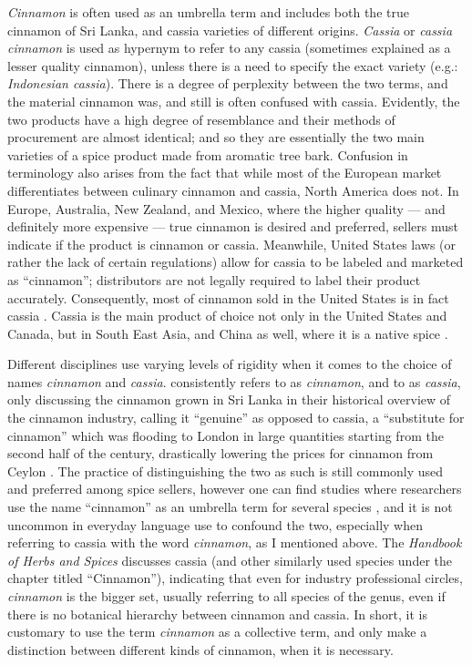\textit{Cinnamon} is often used as an umbrella term and includes both the true cinnamon of Sri Lanka, and cassia varieties of different origins. \textit{Cassia} or \textit{cassia cinnamon} is used as hypernym to refer to any cassia (sometimes explained as a lesser quality cinnamon), unless there is a need to specify the exact variety (e.g.: \textit{Indonesian cassia}). There is a degree of perplexity between the two terms, and the material cinnamon was, and still is often confused with cassia. Evidently, the two products have a high degree of resemblance and their methods of procurement are almost identical; and so they are essentially the two main varieties of a spice product made from aromatic tree bark. Confusion in terminology also arises from the fact that while most of the European market differentiates between culinary cinnamon and cassia, North America does not. In Europe, Australia, New Zealand, and Mexico, where the higher quality --- and definitely more expensive --- true cinnamon is desired and preferred, sellers must indicate if the product is cinnamon or cassia. Meanwhile, United States laws (or rather the lack of certain regulations) allow for cassia to be labeled and marketed as ``cinnamon''; distributors are not legally required to label their product accurately. Consequently, most of cinnamon sold in the United States is in fact cassia \autocite[124]{czarra_spices_2009}. Cassia is the main product of choice not only in the United States and Canada, but in South East Asia, and China as well, where it is a native spice \parencite[104]{van_wyk_culinary_2014}.

Different disciplines use varying levels of rigidity when it comes to the choice of names \textit{cinnamon} and \textit{cassia}. \textcite{wijesekera_chemistry_1978} consistently refers to  as \textit{cinnamon}, and to  as \textit{cassia}, only discussing the cinnamon grown in Sri Lanka in their historical overview of the cinnamon industry, calling it ``genuine'' as opposed to cassia, a ``substitute for cinnamon'' which was flooding to London in large quantities starting from the second half of the  century, drastically lowering the prices for cinnamon from Ceylon \parencite{wijesekera_chemistry_1978}. The practice of distinguishing the two as such is still commonly used and preferred among spice sellers, however one can find studies where researchers use the name ``cinnamon'' as an umbrella term for several species \parencite[see][]{rao_cinnamon_2014}, and it is not uncommon in everyday language use to confound the two, especially when referring to cassia with the word \textit{cinnamon}, as I mentioned above. The \textit{Handbook of Herbs and Spices} \parencite{peter_handbook_2012} discusses cassia (and other similarly used  species under the chapter titled ``Cinnamon''), indicating that even for industry professional circles, \textit{cinnamon} is the bigger set, usually referring to all species of the genus, even if there is no botanical hierarchy between cinnamon and cassia. In short, it is customary to use the term \textit{cinnamon} as a collective term, and only make a distinction between different kinds of cinnamon, when it is necessary. 

